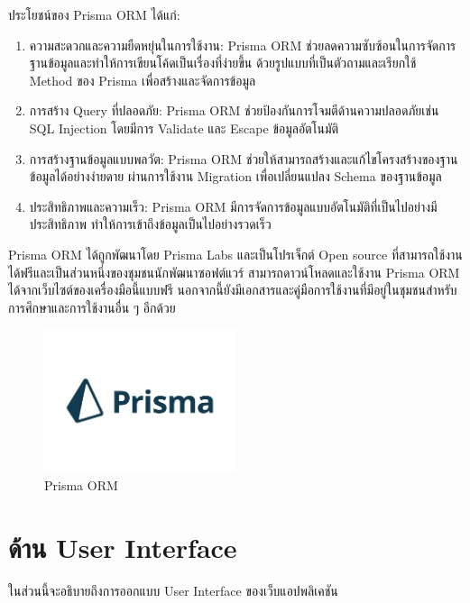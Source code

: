 ประโยชน์ของ Prisma ORM ได้แก่:
\begin{enumerate}
    \item ความสะดวกและความยืดหยุ่นในการใช้งาน: Prisma ORM ช่วยลดความซับซ้อนในการจัดการฐานข้อมูลและทำให้การเขียนโค้ดเป็นเรื่องที่ง่ายขึ้น ด้วยรูปแบบที่เป็นตัวถามและเรียกใช้ Method ของ Prisma เพื่อสร้างและจัดการข้อมูล
    
    \item การสร้าง Query ที่ปลอดภัย: Prisma ORM ช่วยป้องกันการโจมตีด้านความปลอดภัยเช่น SQL Injection โดยมีการ Validate และ Escape ข้อมูลอัตโนมัติ
    
    \item การสร้างฐานข้อมูลแบบพลวัต: Prisma ORM ช่วยให้สามารถสร้างและแก้ไขโครงสร้างของฐานข้อมูลได้อย่างง่ายดาย ผ่านการใช้งาน Migration เพื่อเปลี่ยนแปลง Schema ของฐานข้อมูล
    
    \item ประสิทธิภาพและความเร็ว: Prisma ORM มีการจัดการข้อมูลแบบอัตโนมัติที่เป็นไปอย่างมีประสิทธิภาพ ทำให้การเข้าถึงข้อมูลเป็นไปอย่างรวดเร็ว

\end{enumerate}
Prisma ORM ได้ถูกพัฒนาโดย Prisma Labs และเป็นโปรเจ็กต์ Open source ที่สามารถใช้งานได้ฟรีและเป็นส่วนหนึ่งของชุมชนนักพัฒนาซอฟต์แวร์ สามารถดาวน์โหลดและใช้งาน Prisma ORM ได้จากเว็บไซต์ของเครื่องมือนี้แบบฟรี นอกจากนี้ยังมีเอกสารและคู่มือการใช้งานที่มีอยู่ในชุมชนสำหรับการศึกษาและการใช้งานอื่น ๆ อีกด้วย
\begin{figure}
    \centering
    \includegraphics[width=0.5\textwidth]{img/prisma.jpg}
    \caption{Prisma ORM}
    \label{fig:prisma}
\end{figure}


\section{ด้าน User Interface}
ในส่วนนี้จะอธิบายถึงการออกแบบ User Interface ของเว็บแอปพลิเคชัน

